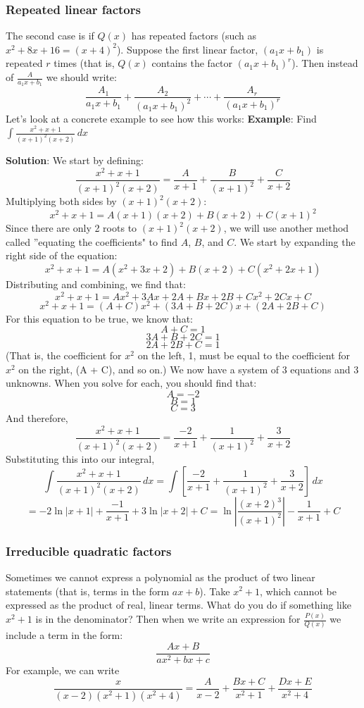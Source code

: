 \subsubsection{Repeated linear factors}
The second case is if $Q(x)$ has repeated factors (such as $x^2 + 8x + 16 = (x 
+ 4)^2$). Suppose the first linear factor, $(a_1x + b_1)$ is repeated $r$ 
times (that is, $Q(x)$ contains the factor $(a_1x + b_1)^r$). Then instead of 
$\frac{A}{a_1x + b_1}$ we should write:
$$\frac{A_1}{a_1x + b_1} + \frac{A_2}{(a_1x + b_1)^2} + \cdots + \frac{A_r}{(
a_1x + b_1)^r}$$
Let's look at a concrete example to see how this works:
\textbf{Example}: Find $\int \frac{x^2 + x + 1}{(x + 1)^2 (x + 2)}\,dx$

\textbf{Solution}: We start by defining:
$$\frac{x^2 + x + 1}{(x + 1)^2 (x + 2)} = \frac{A}{x + 1} + \frac{B}{(x + 1)^
2} + \frac{C}{x + 2}$$
Multiplying both sides by $(x + 1)^2 (x + 2)$:
$$x^2 + x + 1 = A(x + 1)(x + 2) + B(x + 2) + C(x + 1)^2$$
Since there are only 2 roots to $(x + 1)^2 (x + 2)$, we will use another 
method called ''equating the coefficients" to find $A$, $B$, and $C$. We start 
by expanding the right side of the equation:
$$x^2 + x + 1 = A(x^2 + 3x + 2) + B(x + 2) + C(x^2 + 2x + 1)$$
Distributing and combining, we find that:
$$x^2 + x + 1 = Ax^2 + 3Ax + 2A + Bx + 2B + Cx^2 + 2Cx + C$$
$$x^2 + x + 1 = (A + C)x^2 + (3A + B + 2C)x + (2A + 2B + C)$$
For this equation to be true, we know that:
$$A + C = 1$$
$$3A + B + 2C = 1$$
$$2A + 2B + C = 1$$
(That is, the coefficient for $x^2$ on the left, 1, must be equal to the 
coefficient for $x^2$ on the right, (A + C), and so on.) We now have a system 
of 3 equations and 3 unknowns. When you solve for each, you should find that:
$$A = -2$$
$$B = 1$$
$$C = 3$$
And therefore, 
$$\frac{x^2 + x + 1}{(x + 1)^2 (x + 2)} = \frac{-2}{x + 1} + \frac{1}{(x + 1)^
2} + \frac{3}{x + 2}$$
Substituting this into our integral, 
$$\int \frac{x^2 + x + 1}{(x + 1)^2 (x + 2)}\,dx = \int \left[ \frac{-2}{x + 1} 
+ \frac{1}{(x + 1)^2} + \frac{3}{x + 2} \right]\,dx$$
$$ = -2\ln{|x + 1|} + \frac{-1}{x + 1} + 3\ln{|x + 2|} + C = \ln{ \left| \frac{
(x + 2)^3}{(x + 1)^2} \right| } - \frac{1}{x + 1} + C$$

\subsubsection{Irreducible quadratic factors}
Sometimes we cannot express a polynomial as the product of two linear 
statements (that is, terms in the form $ax + b$). Take $x^2 + 1$, which 
cannot be expressed as the product of real, linear terms. What do you do 
if something like $x^2 + 1$ is in the denominator? Then when we write an 
expression for $\frac{P(x)}{Q(x)}$ we include a term in the form:
$$\frac{Ax + B}{ax^2 + bx + c}$$
For example, we can write
$$\frac{x}{(x - 2)(x^2 + 1)(x^2 + 4)} = \frac{A}{x - 2} + \frac{Bx + C}{x^2 + 1} 
+ \frac{Dx + E}{x^2 + 4}$$

